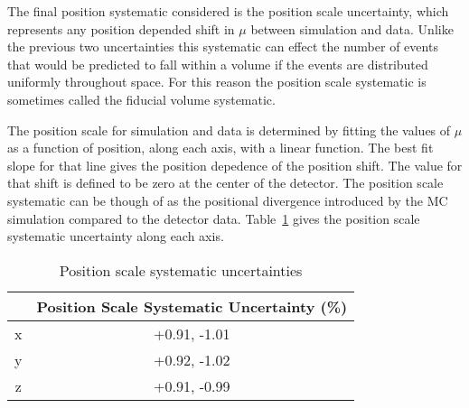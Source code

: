 The final position systematic considered is the position scale uncertainty,
which represents any position depended shift in $\mu$ between simulation
and data. Unlike the previous two uncertainties this systematic can effect the
number of events that would be predicted to fall within a volume if the
events are distributed uniformly throughout space. For this reason the position
scale systematic is sometimes called the fiducial volume systematic.

The position scale for simulation and data is determined by fitting the values
of $\mu$ as a function of position, along each axis, with a linear function.
The best fit slope for that line gives the position depedence of the position
shift. The value for that shift is defined to be zero at the center
of the detector. The position scale systematic can be though of as the
positional divergence introduced by the MC simulation compared to the detector
data. Table~\ref{tbl:position_scale_systs} gives the position scale systematic
uncertainty along each axis.

\begin{table}
    \centering
    \begin{tabular}{|c|c|}
            \hline
            &Position Scale Systematic Uncertainty (\%)\\
            \hline
            x&+0.91, -1.01\\
            y&+0.92, -1.02\\
            z&+0.91, -0.99\\
            \hline
    \end{tabular}
    \caption{Position scale systematic uncertainties}
    \label{tbl:position_scale_systs}
\end{table}

